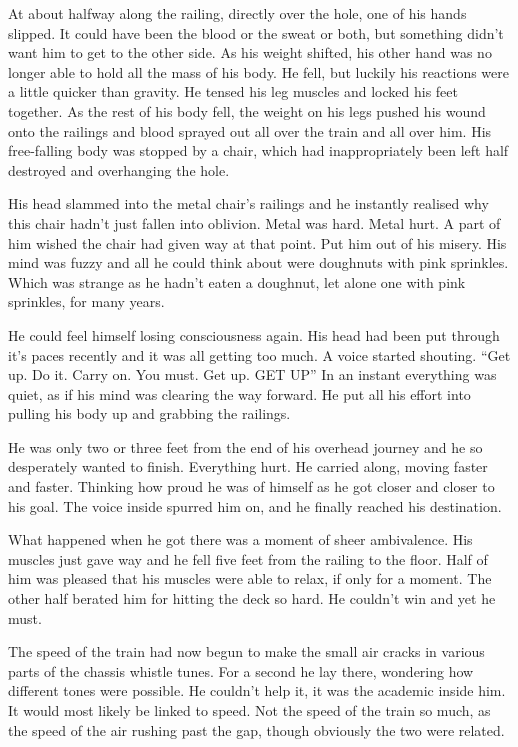 At about halfway along the railing, directly over the hole, one of his hands slipped.  It could have been the blood or the sweat or both, but something didn't want him to get to the other side.  As his weight shifted, his other hand was no longer able to hold all the mass of his body.  He fell, but luckily his reactions were a little quicker than gravity.  He tensed his leg muscles and locked his feet together.  As the rest of his body fell, the weight on his legs pushed his wound onto the railings and blood sprayed out all over the train and all over him.  His free-falling body was stopped by a chair, which had inappropriately been left half destroyed and overhanging the hole.  

His head slammed into the metal chair's railings and he instantly realised why this chair hadn't just fallen into oblivion.  Metal was hard.  Metal hurt.  A part of him wished the chair had given way at that point.  Put him out of his misery.  His mind was fuzzy and all he could think about were doughnuts with pink sprinkles.  Which was strange as he hadn't eaten a doughnut, let alone one with pink sprinkles, for many years.

He could feel himself losing consciousness again.  His head had been put through it's paces recently and it was all getting too much.  A voice started shouting.  ``Get up.  Do it.  Carry on.  You must.  Get up.  GET UP''  In an instant everything was quiet, as if his mind was clearing the way forward.  He put all his effort into pulling his body up and grabbing the railings.

He was only two or three feet from the end of his overhead journey and he so desperately wanted to finish.  Everything hurt.  He carried along, moving faster and faster.  Thinking how proud he was of himself as he got closer and closer to his goal.  The voice inside spurred him on, and he finally reached his destination.

What happened when he got there was a moment of sheer ambivalence.  His muscles just gave way and he fell five feet from the railing to the floor.  Half of him was pleased that his muscles were able to relax, if only for a moment.  The other half berated him for hitting the deck so hard.  He couldn't win and yet he must.



\thoughtbreak



The speed of the train had now begun to make the small air cracks in various parts of the chassis whistle tunes.  For a second he lay there, wondering how different tones were possible.  He couldn't help it, it was the academic inside him.  It would most likely be linked to speed.  Not the speed of the train so much, as the speed of the air rushing past the gap, though obviously the two were related.  

